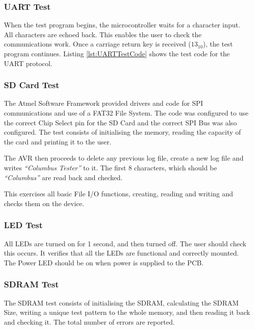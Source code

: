 \subsubsection{UART Test}
When the test program begins, the microcontroller waits for a character input. All characters are echoed back. This enables the user to check the communications work. Once a carriage return key is received ($13_{10}$), the test program continues. Listing \ref{lst:UARTTestCode} shows the test code for the UART protocol.




\subsubsection{SD Card Test}
The Atmel Software Framework \citep{Atmel:ASF} provided drivers and code for SPI communications and use of a FAT32 File System. The code was configured to use the correct Chip Select pin for the SD Card and the correct SPI Bus was also configured. The test consists of initialising the memory, reading the capacity of the card and printing it to the user. 

The AVR then proceeds to delete any previous log file, create a new log file and writes \textit{``Columbus Tester''} to it. The first 8 characters, which should be \textit{``Columbus''} are read back and checked.


This exercises all basic File I/O functions, creating, reading and writing and checks them on the device.

\subsubsection{LED Test}
All LEDs are turned on for 1 second, and then turned off. The user should check this occurs. It verifies that all the LEDs are functional and correctly mounted. The Power LED should be on when power is supplied to the PCB. 

\subsubsection{SDRAM Test}
The SDRAM test consists of initialising the SDRAM, calculating the SDRAM Size, writing a unique test pattern to the whole memory, and then reading it back and checking it. The total number of errors are reported. 

